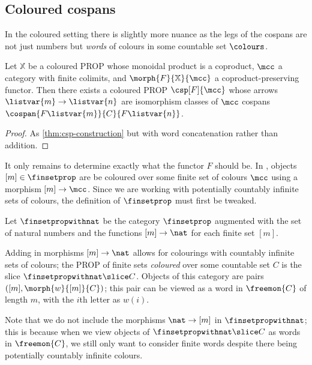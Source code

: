 \subsection{Coloured cospans}

In the coloured setting there is slightly more nuance as the legs of the
cospans are not just numbers but \emph{words} of colours in some countable set
\(\colours\).

\begin{theorem}\label{thm:coloured-csp-construction}
    Let \(\mathbb{X}\) be a coloured PROP whose monoidal product is a coproduct,
    \(\mcc\) a category with finite colimits, and \(
    \morph{F}{\mathbb{X}}{\mcc}
    \) a coproduct-preserving functor.
    Then there exists a coloured PROP \(\csp[F]{\mcc}\) whose arrows
    \(\listvar{m} \to \listvar{n}\) are isomorphism classes of \(\mcc\)
    cospans \(\cospan{F\listvar{m}}{C}{F\listvar{n}}\).
\end{theorem}
\begin{proof}
    As \cref{thm:csp-construction} but with word concatenation rather
    than addition.
\end{proof}

It only remains to determine exactly what the functor \(F\) should be.
In \cite{bonchi2022string}, objects \([m] \in \finsetprop\) are be coloured over
some finite set of colours \(\mcc\) using a morphism \([m] \to \mcc\).
Since we are working with potentially countably infinite sets of colours, the
definition of \(\finsetprop\) must first be tweaked.

\begin{definition}
    Let \(\finsetpropwithnat\) be the category \(\finsetprop\) augmented with the
    set of natural numbers and the functions \([m] \to \nat\) for each finite
    set \([m]\).
\end{definition}

Adding in morphisms \([m] \to \nat\) allows for colourings with countably
infinite sets of colours; the PROP of finite sets \emph{coloured} over some
countable set \(C\) is the slice \(\finsetpropwithnat \slice C\).
Objects of this category are pairs \(([m], \morph{w}{[m]}{C})\); this pair can
be viewed as a word in \(\freemon{C}\) of length \(m\), with the \(i\)th letter
as \(w(i)\).

\begin{remark}
    Note that we do not include the morphisms \(\nat \to [m]\) in
    \(\finsetpropwithnat\); this is because when we view objects of
    \(\finsetpropwithnat \slice C\) as words in \(\freemon{C}\), we still only
    want to consider finite words despite there being potentially countably
    infinite colours.
\end{remark}

